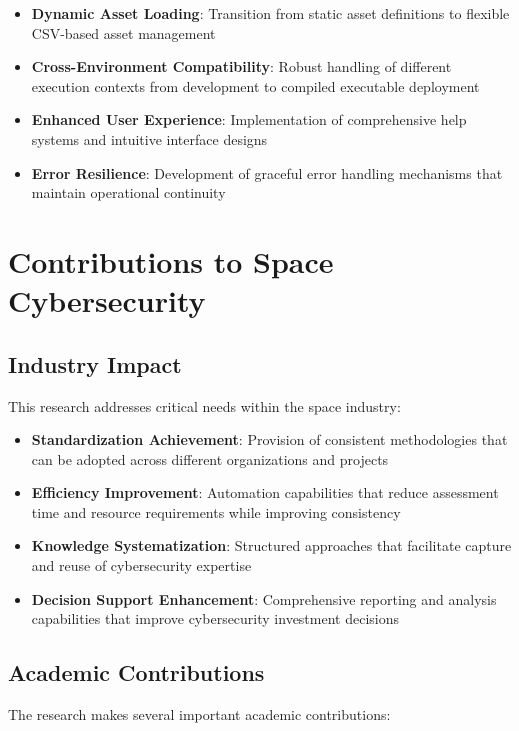 \documentclass[binding=0.6cm]{sapthesis}
\begin{document}
\begin{itemize}
    \item \textbf{Dynamic Asset Loading}: Transition from static asset definitions to flexible CSV-based asset management
    \item \textbf{Cross-Environment Compatibility}: Robust handling of different execution contexts from development to compiled executable deployment
    \item \textbf{Enhanced User Experience}: Implementation of comprehensive help systems and intuitive interface designs
    \item \textbf{Error Resilience}: Development of graceful error handling mechanisms that maintain operational continuity
\end{itemize}

\section{Contributions to Space Cybersecurity}

\subsection{Industry Impact}

This research addresses critical needs within the space industry:

\begin{itemize}
    \item \textbf{Standardization Achievement}: Provision of consistent methodologies that can be adopted across different organizations and projects
    \item \textbf{Efficiency Improvement}: Automation capabilities that reduce assessment time and resource requirements while improving consistency
    \item \textbf{Knowledge Systematization}: Structured approaches that facilitate capture and reuse of cybersecurity expertise
    \item \textbf{Decision Support Enhancement}: Comprehensive reporting and analysis capabilities that improve cybersecurity investment decisions
\end{itemize}

\subsection{Academic Contributions}

The research makes several important academic contributions:
\end{document}
